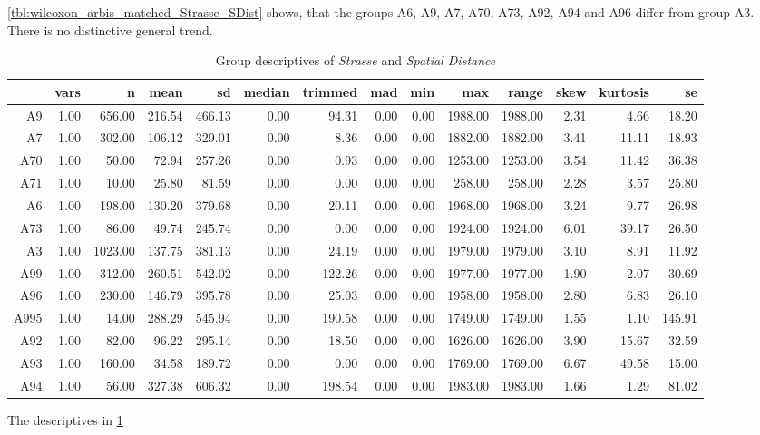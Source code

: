 \cref{tbl:wilcoxon_arbis_matched_Strasse_SDist} shows, that the groups A6, A9, A7, A70, A73, A92, A94 and A96 differ from group A3. There is no distinctive general trend.
\begin{table}[ht!]
	\tiny
	\centering
	\begin{tabular}{rrrrrrrrrrrrrr}
		\hline
		& vars & n & mean & sd & median & trimmed & mad & min & max & range & skew & kurtosis & se \\ 
		\hline
		A9   & 1.00 & 656.00 & 216.54 & 466.13 & 0.00 & 94.31 & 0.00 & 0.00 & 1988.00 & 1988.00 & 2.31 & 4.66 & 18.20 \\ 
		A7   & 1.00 & 302.00 & 106.12 & 329.01 & 0.00 & 8.36 & 0.00 & 0.00 & 1882.00 & 1882.00 & 3.41 & 11.11 & 18.93 \\ 
		A70  & 1.00 & 50.00 & 72.94 & 257.26 & 0.00 & 0.93 & 0.00 & 0.00 & 1253.00 & 1253.00 & 3.54 & 11.42 & 36.38 \\ 
		A71  & 1.00 & 10.00 & 25.80 & 81.59 & 0.00 & 0.00 & 0.00 & 0.00 & 258.00 & 258.00 & 2.28 & 3.57 & 25.80 \\ 
		A6   & 1.00 & 198.00 & 130.20 & 379.68 & 0.00 & 20.11 & 0.00 & 0.00 & 1968.00 & 1968.00 & 3.24 & 9.77 & 26.98 \\ 
		A73  & 1.00 & 86.00 & 49.74 & 245.74 & 0.00 & 0.00 & 0.00 & 0.00 & 1924.00 & 1924.00 & 6.01 & 39.17 & 26.50 \\ 
		A3   & 1.00 & 1023.00 & 137.75 & 381.13 & 0.00 & 24.19 & 0.00 & 0.00 & 1979.00 & 1979.00 & 3.10 & 8.91 & 11.92 \\ 
		A99  & 1.00 & 312.00 & 260.51 & 542.02 & 0.00 & 122.26 & 0.00 & 0.00 & 1977.00 & 1977.00 & 1.90 & 2.07 & 30.69 \\ 
		A96  & 1.00 & 230.00 & 146.79 & 395.78 & 0.00 & 25.03 & 0.00 & 0.00 & 1958.00 & 1958.00 & 2.80 & 6.83 & 26.10 \\ 
		A995 & 1.00 & 14.00 & 288.29 & 545.94 & 0.00 & 190.58 & 0.00 & 0.00 & 1749.00 & 1749.00 & 1.55 & 1.10 & 145.91 \\ 
		A92  & 1.00 & 82.00 & 96.22 & 295.14 & 0.00 & 18.50 & 0.00 & 0.00 & 1626.00 & 1626.00 & 3.90 & 15.67 & 32.59 \\ 
		A93  & 1.00 & 160.00 & 34.58 & 189.72 & 0.00 & 0.00 & 0.00 & 0.00 & 1769.00 & 1769.00 & 6.67 & 49.58 & 15.00 \\ 
		A94  & 1.00 & 56.00 & 327.38 & 606.32 & 0.00 & 198.54 & 0.00 & 0.00 & 1983.00 & 1983.00 & 1.66 & 1.29 & 81.02 \\ 
		\bottomrule
	\end{tabular}
	\caption{Group descriptives of \textit{Strasse} and \textit{Spatial Distance}}
	\label{tbl:descriptives_arbis_matched_Strasse_SDist}
\end{table}
The descriptives in \cref{tbl:descriptives_arbis_matched_Strasse_SDist}

